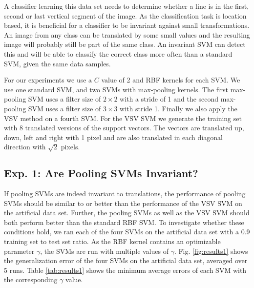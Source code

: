 \documentclass[10pt,twocolumn,letterpaper]{article}
\begin{document}
\noindent A classifier learning this data set needs to determine whether a line is in the first, second or last vertical segment of the image. 
As the classification task is location based, it is beneficial for a classifier to be invariant against small transformations. 
An image from any class can be translated by some small values and the resulting image will probably still be part of the same class.
An invariant SVM can detect this and will be able to classify the correct class more often than a standard SVM, given the same data samples. 

For our experiments we use a $C$ value of 2 and RBF kernels for each SVM. 
We use one standard SVM, and two SVMs with max-pooling kernels. 
The first max-pooling SVM uses a filter size of $2\times 2$ with a stride of 1 and the second max-pooling SVM uses a filter size of $3\times 3$ with stride 1. 
Finally we also apply the VSV method on a fourth SVM. 
For the VSV SVM we generate the training set with 8 translated versions of the support vectors. 
The vectors are translated up, down, left and right with 1 pixel and are also translated in each diagonal direction with $\sqrt{2}$ pixels. 

\subsection{Exp. 1: Are Pooling SVMs Invariant?}

If pooling SVMs are indeed invariant to translations, the performance of pooling SVMs should be similar to or better than the performance of the VSV SVM on the artificial data set. 
Further, the pooling SVMs as well as the VSV SVM should both perform better than the standard RBF SVM. 
To investigate whether these conditions hold, we ran each of the four SVMs on the artificial data set with a 0.9 training set to test set ratio.
As the RBF kernel contains an optimizable parameter $\gamma$, the SVMs are run with multiple values of $\gamma$. 
Fig. \ref{fig:results1} shows the generalization error of the four SVMs on the artificial data set, averaged over 5 runs.
Table \ref{tab:results1} shows the minimum average errors of each SVM with the corresponding $\gamma$ value.
\end{document}
